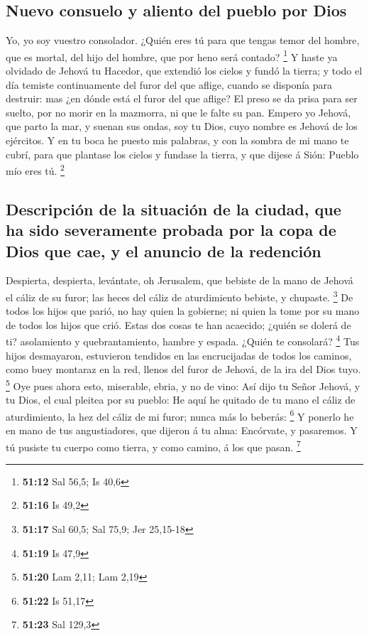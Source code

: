 \hypertarget{nuevo-consuelo-y-aliento-del-pueblo-por-dios}{%
\subsection{Nuevo consuelo y aliento del pueblo por
Dios}\label{nuevo-consuelo-y-aliento-del-pueblo-por-dios}}

 Yo, yo soy vuestro consolador. ¿Quién eres tú para que
tengas temor del hombre, que es mortal, del hijo del hombre, que por
heno será contado? \footnote{\textbf{51:12} Sal 56,5; Is 40,6}
 Y haste ya olvidado de Jehová tu Hacedor, que extendió los
cielos y fundó la tierra; y todo el día temiste continuamente del furor
del que aflige, cuando se disponía para destruir: mas ¿en dónde está el
furor del que aflige?  El preso se da prisa para ser
suelto, por no morir en la mazmorra, ni que le falte su pan.
 Empero yo Jehová, que parto la mar, y suenan sus ondas,
soy tu Dios, cuyo nombre es Jehová de los ejércitos.  Y en
tu boca he puesto mis palabras, y con la sombra de mi mano te cubrí,
para que plantase los cielos y fundase la tierra, y que dijese á Sión:
Pueblo mío eres tú. \footnote{\textbf{51:16} Is 49,2}

\hypertarget{descripciuxf3n-de-la-situaciuxf3n-de-la-ciudad-que-ha-sido-severamente-probada-por-la-copa-de-dios-que-cae-y-el-anuncio-de-la-redenciuxf3n}{%
\subsection{Descripción de la situación de la ciudad, que ha sido
severamente probada por la copa de Dios que cae, y el anuncio de la
redención}\label{descripciuxf3n-de-la-situaciuxf3n-de-la-ciudad-que-ha-sido-severamente-probada-por-la-copa-de-dios-que-cae-y-el-anuncio-de-la-redenciuxf3n}}

 Despierta, despierta, levántate, oh Jerusalem, que bebiste
de la mano de Jehová el cáliz de su furor; las heces del cáliz de
aturdimiento bebiste, y chupaste. \footnote{\textbf{51:17} Sal 60,5; Sal
  75,9; Jer 25,15-18}  De todos los hijos que parió, no hay
quien la gobierne; ni quien la tome por su mano de todos los hijos que
crió.  Estas dos cosas te han acaecido; ¿quién se dolerá de
ti? asolamiento y quebrantamiento, hambre y espada. ¿Quién te consolará?
\footnote{\textbf{51:19} Is 47,9}  Tus hijos desmayaron,
estuvieron tendidos en las encrucijadas de todos los caminos, como buey
montaraz en la red, llenos del furor de Jehová, de la ira del Dios tuyo.
\footnote{\textbf{51:20} Lam 2,11; Lam 2,19}  Oye pues
ahora esto, miserable, ebria, y no de vino:  Así dijo tu
Señor Jehová, y tu Dios, el cual pleitea por su pueblo: He aquí he
quitado de tu mano el cáliz de aturdimiento, la hez del cáliz de mi
furor; nunca más lo beberás: \footnote{\textbf{51:22} Is 51,17}
 Y ponerlo he en mano de tus angustiadores, que dijeron á
tu alma: Encórvate, y pasaremos. Y tú pusiste tu cuerpo como tierra, y
como camino, á los que pasan. \footnote{\textbf{51:23} Sal 129,3}

